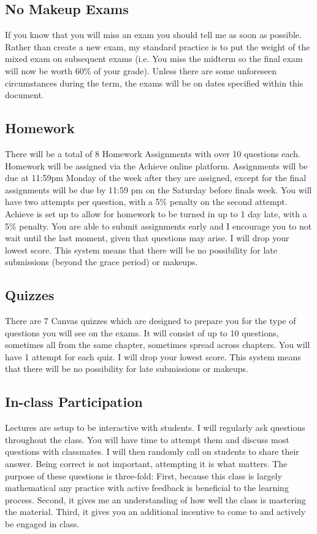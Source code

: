 \subsection*{No Makeup Exams}
If you know that you will miss an exam you should tell me as soon as possible.
Rather than create a new exam, my standard practice is to put the weight of the mixed exam on subsequent exams
(i.e. You miss the midterm so the final exam will now be worth 60\% of your grade).
Unless there are some unforeseen circumstances during the term, the exams will be on dates specified within this document.

\hypertarget{grading_HW}{\subsection{Homework}}
There will be a total of 8 Homework Assignments with over 10 questions each.
Homework will be assigned via the Achieve online platform.
Assignments will be due at 11:59pm Monday of the week after they are assigned, except for the final assignments will be due by 11:59 pm on the Saturday before finals week.
You will have two attempts per question, with a 5\% penalty on the second attempt.
Achieve is set up to allow for homework to be turned in up to 1 day late, with a 5\% penalty.
You are able to submit assignments early and I encourage you to not wait until the last moment, given that questions may arise.
I will drop your lowest score.
This system means that there will be no possibility for late submissions (beyond the grace period) or makeups.
 
\hypertarget{grading_quiz}{\subsection{Quizzes}}
There are 7 Canvas quizzes which are designed to prepare you for the type of questions you will see on the exams.
It will consist of up to 10 questions, sometimes all from the same chapter, sometimes spread across chapters.
You will have 1 attempt for each quiz. I will drop your lowest score.
This system means that there will be no possibility for late submissions or makeups.

\hypertarget{grading_participation}{\subsection{In-class Participation}}
Lectures are setup to be interactive with students.
I will regularly ask questions throughout the class.
You will have time to attempt them and discuss most questions with classmates.
I will then randomly call on students to share their answer.
Being correct is not important, attempting it is what matters.
The purpose of these questions is three-fold:
First, because this class is largely mathematical any practice with active feedback is beneficial to the learning process.
Second, it gives me an understanding of how well the class is mastering the material.
Third, it gives you an additional incentive to come to and actively be engaged in class.
